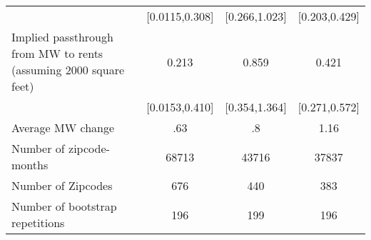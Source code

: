 {\begin{tabular}{l*{3}{c}}
            &        [0.0115,0.308]         &         [0.266,1.023]         &         [0.203,0.429]         \\
[1em]
Implied passthrough from MW to rents (assuming 2000 square feet)&                 0.213\sym{*}  &                 0.859\sym{***}&                 0.421\sym{***}\\
            &        [0.0153,0.410]         &         [0.354,1.364]         &         [0.271,0.572]         \\
\hline
Average MW change&                   .63         &                    .8         &                  1.16         \\
Number of zipcode-months&                 68713         &                 43716         &                 37837         \\
Number of Zipcodes&                   676         &                   440         &                   383         \\
Number of bootstrap repetitions&                   196         &                   199         &                   196         \\
\hline\hline
\end{tabular}
}
